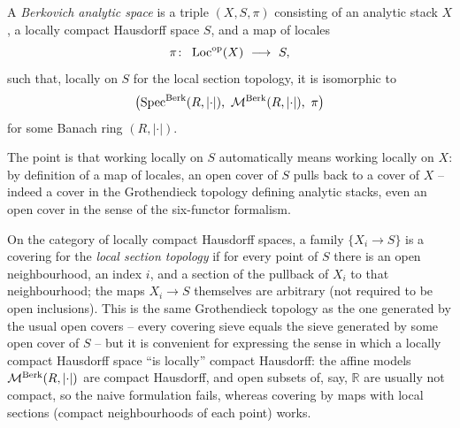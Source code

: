 \begin{definition}
\label{def:23:berkovich-analytic-space}
A \emph{Berkovich analytic space} is a triple $(X,S,\pi)$ consisting of an
analytic stack $X$, a locally compact Hausdorff space $S$, and a map of locales
\begin{equation*}
\pi\colon\ \Loc^{\mathrm{op}}(X)\ \longrightarrow\ S ,
\end{equation*}
such that, locally on $S$ for the local section topology, it is isomorphic to
\begin{equation*}
\bigl(\operatorname{Spec}^{\mathrm{Berk}}(R,\lvert\cdot\rvert),\
\mathcal{M}^{\mathrm{Berk}}(R,\lvert\cdot\rvert),\ \pi\bigr)
\end{equation*}
for some Banach ring $(R,\lvert\cdot\rvert)$.
\end{definition}

The point is that working locally on $S$ automatically means working locally on
$X$: by definition of a map of locales, an open cover of $S$ pulls back to a
cover of $X$ -- indeed a cover in the Grothendieck topology defining analytic
stacks, even an open cover in the sense of the six-functor formalism.

\begin{notation}
\label{not:23:local-section}
On the category of locally compact Hausdorff spaces, a family $\{X_i\to S\}$ is a
covering for the \emph{local section topology} if for every point of $S$ there is
an open neighbourhood, an index $i$, and a section of the pullback of $X_i$ to
that neighbourhood; the maps $X_i\to S$ themselves are arbitrary (not required to
be open inclusions). This is the same Grothendieck topology as the one generated
by the usual open covers -- every covering sieve equals the sieve generated by
some open cover of $S$ -- but it is convenient for expressing the sense in which
a locally compact Hausdorff space ``is locally'' compact Hausdorff: the affine
models $\mathcal{M}^{\mathrm{Berk}}(R,\lvert\cdot\rvert)$ are compact Hausdorff, and open subsets of,
say, $\mathbb R$ are usually not compact, so the naive formulation fails, whereas
covering by maps with local sections (compact neighbourhoods of each point) works.
\end{notation}

